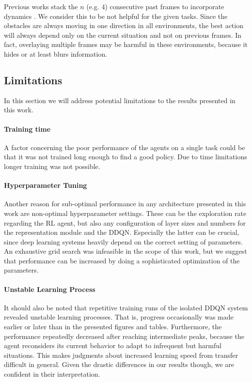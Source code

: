 Previous works stack the $n$ (e.g. $4$) consecutive past frames to incorporate dynamics \citep{DQN, DDQN, DuelingDQN}. We consider this to be not helpful for the given tasks. Since the obstacles are always moving in one direction in all environments, the best action will always depend only on the current situation and not on previous frames. In fact, overlaying multiple frames may be harmful in these environments, because it hides or at least blurs information.


\subsection{Limitations}
In this section we will address potential limitations to the results presented in this work.

\paragraph{Training time} A factor concerning the poor performance of the agents on a single task could be that it was not trained long enough to find a good policy. Due to time limitations longer training was not possible.

\paragraph{Hyperparameter Tuning} Another reason for sub-optimal performance in any architecture presented in this work are non-optimal hyperparameter settings. These can be the exploration rate regarding the RL agent, but also any configuration of layer sizes and numbers for the representation module and the DDQN. Especially the latter can be crucial, since deep learning systems heavily depend on the correct setting of parameters. An exhaustive grid search was infeasible in the scope of this work, but we suggest that performance can be increased by doing a sophisticated optimization of the parameters.

\paragraph{Unstable Learning Process} It should also be noted that repetitive training runs of the isolated DDQN system revealed unstable learning processes. That is, progress occasionally was made earlier or later than in the presented figures and tables. Furthermore, the performance repeatedly decreased after reaching intermediate peaks, because the agent reconsiders its current behavior to adapt to infrequent but harmful situations. This makes judgments about increased learning speed from transfer difficult in general. Given the drastic differences in our results though, we are confident in their interpretation.  